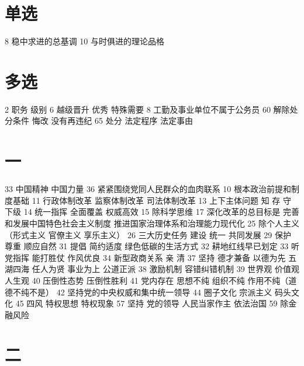 \documentclass[cyan]{elegantnote}
\begin{document}
\section{单选}
\label{sec:org3d01d24}
8 稳中求进的总基调
10 与时俱进的理论品格
\section{多选}
\label{sec:org41d0a01}
2 职务 级别
6 越级晋升 优秀 特殊需要
8 工勤及事业单位不属于公务员
60 解除处分条件 悔改 没有再违纪
65 处分 法定程序 法定事由
\section{一}
\label{sec:org6af94d1}
33 中国精神 中国力量
36 紧紧围绕党同人民群众的血肉联系
10 根本政治前提和制度基础
11 行政体制改革 监察体制改革 司法体制改革
13 上下主体问题 知 存 守 下级
14 统一指挥 全面覆盖 权威高效
15 除科学思维
17 深化改革的总目标是
完善和发展中国特色社会主义制度
推进国家治理体系和治理能力现代化
25 除个人主义（形式主义 官僚主义 享乐主义）
26 三大历史任务 建设 统一 共同发展
29 保护 尊重 顺应自然
31 提倡 简约适度 绿色低碳的生活方式
32 耕地红线早已划定
33 听党指挥 能打胜仗 作风优良
34 新型政商关系 亲 清
37 坚持 德才兼备 以德为先 五湖四海 任人为贤 事业为上 公道正派
38 激励机制 容错纠错机制
39 世界观 价值观 人生观
40 压倒性态势 压倒性胜利
41 党内存在 思想不纯 组织不纯 作用不纯（道德不纯不是）
42 坚持党的中央权威和集中统一领导
44 圈子文化 宗派主义 码头文化
45 四风 特权思想 特权现象
57 坚持 党的领导 人民当家作主 依法治国
59 除金融风险
\section{二}
\label{sec:org0892e4a}
\end{document}
